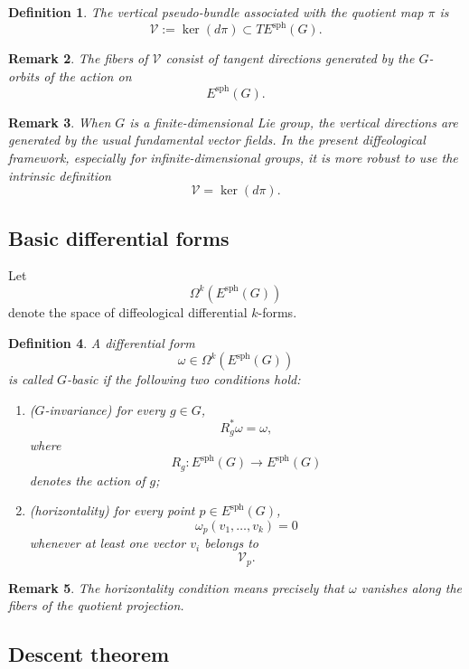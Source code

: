 \documentclass[11pt]{amsart}
\newtheorem{definition}{Definition}[section]
\newtheorem{remark}[definition]{Remark}
\begin{document}
\begin{definition}
The \emph{vertical pseudo-bundle} associated with the quotient map \(\pi\) is
\[
\mathcal V
:=
\ker(d\pi)
\subset
T E^{\mathrm{sph}}(G).
\]
\end{definition}

\begin{remark}
The fibers of \(\mathcal V\) consist of tangent directions generated by the
\(G\)-orbits of the action on
\[
E^{\mathrm{sph}}(G).
\]
\end{remark}

\begin{remark}
When \(G\) is a finite-dimensional Lie group, the vertical directions are
generated by the usual fundamental vector fields. In the present diffeological
framework, especially for infinite-dimensional groups, it is more robust to use
the intrinsic definition
\[
\mathcal V=\ker(d\pi).
\]
\end{remark}

\subsection{Basic differential forms}

Let
\[
\Omega^k(E^{\mathrm{sph}}(G))
\]
denote the space of diffeological differential \(k\)-forms.

\begin{definition}
A differential form
\[
\omega\in \Omega^k(E^{\mathrm{sph}}(G))
\]
is called \emph{\(G\)-basic} if the following two conditions hold:

\begin{enumerate}
\item (\emph{\(G\)-invariance})
for every \(g\in G\),
\[
R_g^*\omega=\omega,
\]
where
\[
R_g:E^{\mathrm{sph}}(G)\to E^{\mathrm{sph}}(G)
\]
denotes the action of \(g\);

\item (\emph{horizontality})
for every point \(p\in E^{\mathrm{sph}}(G)\),
\[
\omega_p(v_1,\dots,v_k)=0
\]
whenever at least one vector \(v_i\) belongs to
\[
\mathcal V_p.
\]
\end{enumerate}
\end{definition}

\begin{remark}
The horizontality condition means precisely that \(\omega\) vanishes along the
fibers of the quotient projection.
\end{remark}

\subsection{Descent theorem}
\end{document}
